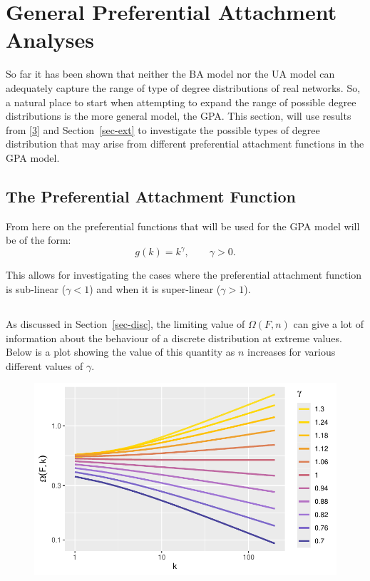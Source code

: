\documentclass[
  10pt,
  a4paper,
]{scrreprt}
\theoremstyle{definition}
\theoremstyle{plain}
\theoremstyle{plain}
\theoremstyle{plain}
\theoremstyle{remark}
\begin{document}
{\hypertarget{general-preferential-attachment-analyses}{%
\section{General Preferential Attachment
Analyses}\label{general-preferential-attachment-analyses}}

So far it has been shown that neither the BA model nor the UA model can
adequately capture the range of type of degree distributions of real
networks. So, a natural place to start when attempting to expand the
range of possible degree distributions is the more general model, the
GPA. This section, will use results from
{[}\protect\hyperlink{ref-shimura12}{3}{]} and Section~\ref{sec-ext} to
investigate the possible types of degree distribution that may arise
from different preferential attachment functions in the GPA model.

\hypertarget{the-preferential-attachment-function}{%
\subsection{The Preferential Attachment
Function}\label{the-preferential-attachment-function}}

From here on the preferential functions that will be used for the GPA
model will be of the form: \[
g(k) = k^\gamma, \qquad \gamma>0.
\]

This allows for investigating the cases where the preferential
attachment function is sub-linear (\(\gamma<1\)) and when it is
super-linear (\(\gamma>1\)).

\hypertarget{section}{%
\subsection{}\label{section}}

As discussed in Section~\ref{sec-disc}, the limiting value of
\(\Omega(F,n)\) can give a lot of information about the behaviour of a
discrete distribution at extreme values. Below is a plot showing the
value of this quantity as \(n\) increases for various different values
of \(\gamma\).

\begin{figure}[H]

{\centering \includegraphics{doc_files/figure-pdf/fig-omega-1.pdf}

}
\end{figure}}
\end{document}
